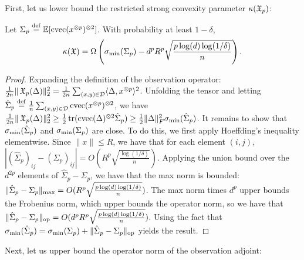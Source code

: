 
First, let us lower bound the restricted strong convexity parameter $\kappa(\operatorname{\mathfrak{X}}_p)$:

\begin{lemma}
\label{lem:lowRankLower}
Let $\Sigma_p \stackrel{\rm def}{=} \operatorname{\mathbb{E}}[\operatorname{cvec}(x^{\otimes p})^{\otimes 2}]$.
With probability at least $1-\delta$,
$$\kappa(\operatorname{\mathfrak{X}}) = \Omega\left(\sigma_\text{\rm min}(\Sigma_p) - d^p R^{p} \sqrt{\frac{p \log(d) \log (1/\delta)}{n}}\right).$$
\end{lemma}
\begin{proof}
Expanding the definition of the observation operator:
$\frac{1}{2n} \|\operatorname{\mathfrak{X}}_p(\Delta)\|_2^2
= \frac{1}{2n} \sum_{(x,y) \in \mathcal{D}} \langle \Delta, x^{\otimes p} \rangle^2$.
Unfolding the tensor and letting $\hat\Sigma_p \stackrel{\rm def}{=} \frac{1}{n} \sum_{(x,y) \in \mathcal{D}} \operatorname{cvec}(x^{\otimes p})^{\otimes 2}$,
we have 
$\frac{1}{2n} \|\operatorname{\mathfrak{X}}_p(\Delta)\|_2^2
\ge \frac{1}{2} \operatorname{tr}(\operatorname{cvec}(\Delta)^{\otimes 2} \hat\Sigma_p)
\ge \frac{1}{2} \|\Delta\|_F^2 \sigma_\text{\rm min}(\hat\Sigma_p)$.
It remains to show that $\sigma_\text{\rm min}(\hat\Sigma_p)$ and $\sigma_\text{\rm min}(\Sigma_p)$ are close.
To do this, we first apply Hoeffding's inequality elementwise.
Since $\|x\| \le R$, we have that for each element $(i,j)$,
$|(\hat\Sigma_p)_{ij} - (\Sigma_p)_{ij}| = O(R^{p}\sqrt{\frac{\log (1/\delta)}{n}})$.
Applying the union bound over the $d^{2p}$ elements of $\hat\Sigma_p - \Sigma_p$,
we have that the max norm is bounded:
$\|\hat\Sigma_p - \Sigma_p\|_\text{\rm max} = O(R^{p} \sqrt{\frac{p \log(d) \log (1/\delta)}{n}})$.
The max norm times $d^p$ upper bounds the Frobenius norm, which upper bounds the operator norm, so we have that
$\|\hat\Sigma_p - \Sigma_p\|_\text{\rm op} = O(d^p R^{p} \sqrt{\frac{p \log(d) \log (1/\delta)}{n}})$.
Using the fact that $\sigma_\text{\rm min}(\hat\Sigma_p) = \sigma_\text{\rm min}(\Sigma_p) + \|\hat\Sigma_p - \Sigma_p\|_\text{\rm op}$
yields the result.
\end{proof}

Next, let us upper bound the operator norm of the observation adjoint:

